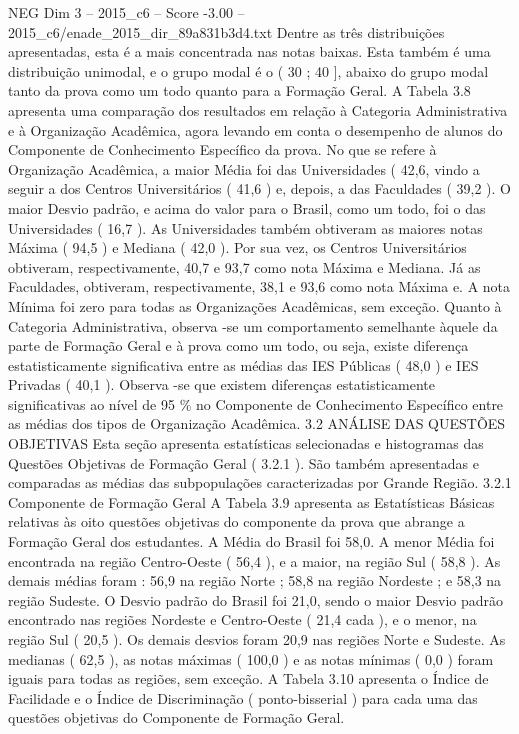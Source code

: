 \begin{textsample}{NEG Dim 3 – 2015\_c6 – Score -3.00 – 2015\_c6/enade\_2015\_dir\_89a831b3d4.txt}
Dentre as três distribuições apresentadas, esta é a mais concentrada nas notas baixas.
Esta também é uma distribuição unimodal, e o grupo modal é o ( 30 ; 40 ], abaixo do grupo modal tanto da prova como um todo quanto para a Formação Geral.
A Tabela 3.8 apresenta uma comparação dos resultados em relação à Categoria Administrativa e à Organização Acadêmica, agora levando em conta o desempenho de alunos do Componente de Conhecimento Específico da prova.
No que se refere à Organização Acadêmica, a maior Média foi das Universidades ( 42,6, vindo a seguir a dos Centros Universitários ( 41,6 ) e, depois, a das Faculdades ( 39,2 ).
O maior Desvio padrão, e acima do valor para o Brasil, como um todo, foi o das Universidades ( 16,7 ).
As Universidades também obtiveram as maiores notas Máxima ( 94,5 ) e Mediana ( 42,0 ).
Por sua vez, os Centros Universitários obtiveram, respectivamente, 40,7 e 93,7 como nota Máxima e Mediana.
Já as Faculdades, obtiveram, respectivamente, 38,1 e 93,6 como nota Máxima e.
A nota Mínima foi zero para todas as Organizações Acadêmicas, sem exceção.
Quanto à Categoria Administrativa, observa -se um comportamento semelhante àquele da parte de Formação Geral e à prova como um todo, ou seja, existe diferença estatisticamente significativa entre as médias das IES Públicas ( 48,0 ) e IES Privadas ( 40,1 ).
Observa -se que existem diferenças estatisticamente significativas ao nível de 95 \% no Componente de Conhecimento Específico entre as médias dos tipos de Organização Acadêmica. 3.2 ANÁLISE DAS QUESTÕES OBJETIVAS Esta seção apresenta estatísticas selecionadas e histogramas das Questões Objetivas de Formação Geral ( 3.2.1 ).
São também apresentadas e comparadas as médias das subpopulações caracterizadas por Grande Região. 3.2.1 Componente de Formação Geral A Tabela 3.9 apresenta as Estatísticas Básicas relativas às oito questões objetivas do componente da prova que abrange a Formação Geral dos estudantes.
A Média do Brasil foi 58,0.
A menor Média foi encontrada na região Centro-Oeste ( 56,4 ), e a maior, na região Sul ( 58,8 ).
As demais médias foram : 56,9 na região Norte ; 58,8 na região Nordeste ; e 58,3 na região Sudeste.
O Desvio padrão do Brasil foi 21,0, sendo o maior Desvio padrão encontrado nas regiões Nordeste e Centro-Oeste ( 21,4 cada ), e o menor, na região Sul ( 20,5 ).
Os demais desvios foram 20,9 nas regiões Norte e Sudeste.
As medianas ( 62,5 ), as notas máximas ( 100,0 ) e as notas mínimas ( 0,0 ) foram iguais para todas as regiões, sem exceção.
A Tabela 3.10 apresenta o Índice de Facilidade e o Índice de Discriminação ( ponto-bisserial ) para cada uma das questões objetivas do Componente de Formação Geral.

\end{textsample}
